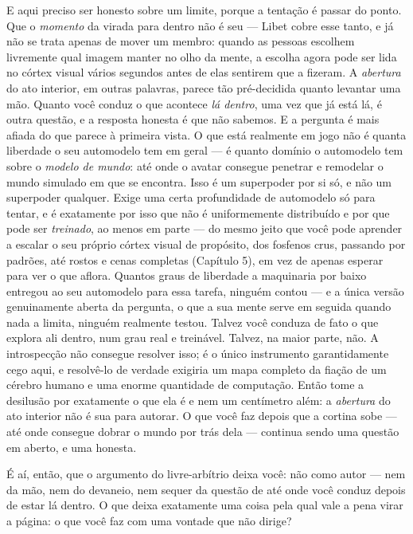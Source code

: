 \documentclass[11pt, twoside, openright]{book}
\begin{document}
E aqui preciso ser honesto sobre um limite, porque a tentação é passar do ponto. Que o \textit{momento} da virada para dentro não é seu --- Libet cobre esse tanto, e já não se trata apenas de mover um membro: quando as pessoas escolhem livremente qual imagem manter no olho da mente, a escolha agora pode ser lida no córtex visual vários segundos antes de elas sentirem que a fizeram. A \textit{abertura} do ato interior, em outras palavras, parece tão pré-decidida quanto levantar uma mão. Quanto você conduz o que acontece \textit{lá dentro}, uma vez que já está lá, é outra questão, e a resposta honesta é que não sabemos. E a pergunta é mais afiada do que parece à primeira vista. O que está realmente em jogo não é quanta liberdade o seu automodelo tem em geral --- é quanto domínio o automodelo tem sobre o \textit{modelo de mundo}: até onde o avatar consegue penetrar e remodelar o mundo simulado em que se encontra. Isso é um superpoder por si só, e não um superpoder qualquer. Exige uma certa profundidade de automodelo só para tentar, e é exatamente por isso que não é uniformemente distribuído e por que pode ser \textit{treinado}, ao menos em parte --- do mesmo jeito que você pode aprender a escalar o seu próprio córtex visual de propósito, dos fosfenos crus, passando por padrões, até rostos e cenas completas (Capítulo 5), em vez de apenas esperar para ver o que aflora. Quantos graus de liberdade a maquinaria por baixo entregou ao seu automodelo para essa tarefa, ninguém contou --- e a única versão genuinamente aberta da pergunta, o que a sua mente serve em seguida quando nada a limita, ninguém realmente testou. Talvez você conduza de fato o que explora ali dentro, num grau real e treinável. Talvez, na maior parte, não. A introspecção não consegue resolver isso; é o único instrumento garantidamente cego aqui, e resolvê-lo de verdade exigiria um mapa completo da fiação de um cérebro humano e uma enorme quantidade de computação. Então tome a desilusão por exatamente o que ela é e nem um centímetro além: a \textit{abertura} do ato interior não é sua para autorar. O que você faz depois que a cortina sobe --- até onde consegue dobrar o mundo por trás dela --- continua sendo uma questão em aberto, e uma honesta.

É aí, então, que o argumento do livre-arbítrio deixa você: não como autor --- nem da mão, nem do devaneio, nem sequer da questão de até onde você conduz depois de estar lá dentro. O que deixa exatamente uma coisa pela qual vale a pena virar a página: o que você faz com uma vontade que não dirige?
\end{document}
